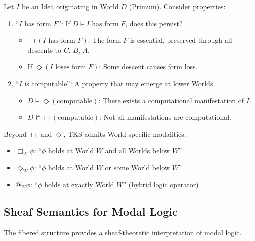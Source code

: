 \begin{example}
\label{ex:modal-properties}
Let $I$ be an Idea originating in World $D$ (Primum). Consider properties:
\begin{enumerate}
  \item ``$I$ has form $F$'': If $D \vDash I \text{ has form } F$, does this persist?
    \begin{itemize}
      \item $\Box(I \text{ has form } F)$: The form $F$ is essential, preserved through
            all descents to $C$, $B$, $A$.
      \item If $\Diamond(I \text{ loses form } F)$: Some descent causes form loss.
    \end{itemize}
  \item ``$I$ is computable'': A property that may emerge at lower Worlds.
    \begin{itemize}
      \item $D \vDash \Diamond(\text{computable})$: There exists a computational
            manifestation of $I$.
      \item $D \not\vDash \Box(\text{computable})$: Not all manifestations are computational.
    \end{itemize}
\end{enumerate}
\end{example}

\begin{definition}
\label{def:world-specific-modalities}
Beyond $\Box$ and $\Diamond$, TKS admits World-specific modalities:
\begin{itemize}
  \item $\Box_W \phi$: ``$\phi$ holds at World $W$ and all Worlds below $W$''
  \item $\Diamond_W \phi$: ``$\phi$ holds at World $W$ or some World below $W$''
  \item $@_W \phi$: ``$\phi$ holds at exactly World $W$'' (hybrid logic operator)
\end{itemize}
\end{definition}

\subsection{Sheaf Semantics for Modal Logic}
\label{subsec:sheaf-modal}

The fibered structure provides a sheaf-theoretic interpretation of modal logic.

